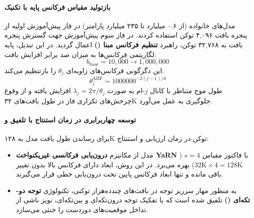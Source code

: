 \item {}

\paragraph*{بازتولید مقیاس فرکانس پایه با تکنیک }
مدل‌های خانواده  \cite{qwen2025qwen3} (از ۰.۶ میلیارد تا ۲۳۵ میلیارد پارامتر) در فاز پیش‌آموزش اولیه از پنجره بافت ۴,۰۹۶ توکن استفاده کردند. در فاز سوم پیش‌آموزش جهت گسترش پنجره بافت به ۳۲,۷۶۸ توکن، راهبرد \textbf{تنظیم فرکانس مبنا ()} \cite{xiong2023effective} اعمال گردید. در این تبدیل، پایه لگاریتمی فرکانس‌ها به میزان صد برابر افزایش یافت:
\begin{equation}
    b_{\text{base}} = 10,000 \longrightarrow 1,000,000
\end{equation}
این دگرگونی فرکانس‌های زاویه‌ای $\theta_j$ را بازتنظیم می‌کند:
\begin{equation}
    \theta_j^{\text{ABF}} = 1000000^{-2(j-1)/d}
\end{equation}
طول موج متناظر با کانال $j$-ام به صورت $\lambda_j = 2\pi / \theta_j$ افزایش یافته و از وقوع چرخش‌های تکراری فاز در طول بافت‌های ۳۲K جلوگیری به عمل می‌آورد.

\paragraph*{توسعه چهاربرابری در زمان استنتاج با تلفیق  و }
برای رساندن طول بافت مدل به ۱۲۸K توکن در زمان ارزیابی و استنتاج:
\begin{itemize}
    \item مدل از مکانیزم \textbf{درون‌یابی فرکانسی غیریکنواخت YaRN} \cite{peng2023yarn} با فاکتور مقیاس $s = 4$ ($32\text{K} \times 4 = 128\text{K}$) بهره می‌برد. در این روش، ابعاد دارای فرکانس بالا بدون تغییر باقی مانده و تنها ابعاد فرکانس پایین تحت درون‌یابی خطی قرار می‌گیرند.
    \item به منظور مهار سرریز توجه در بافت‌های چندده‌هزار توکنی، تکنولوژی \textbf{توجه دو-تکه‌ای ()} \cite{an2024training} تلفیق شده است که با تفکیک توجه درون‌تکه‌ای و بین‌تکه‌ای، نویز ناشی از تداخل موقعیت‌های دوردست را خنثی می‌سازد.
\end{itemize}